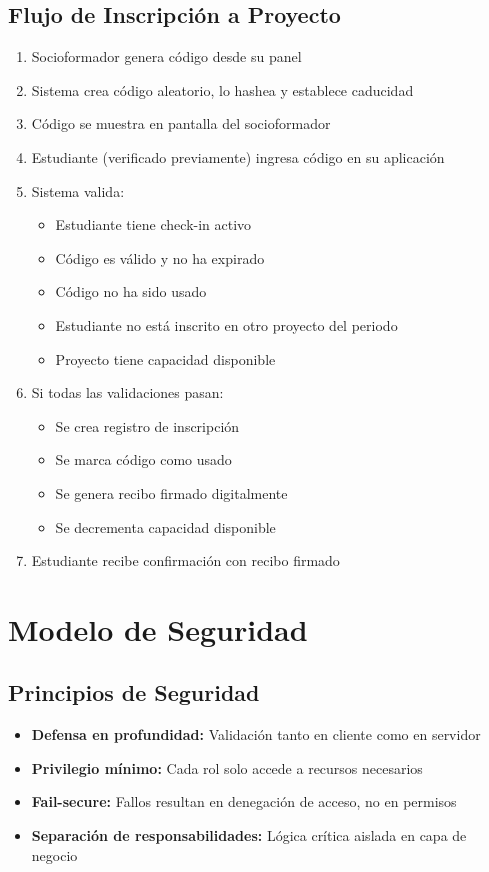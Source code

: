 \documentclass[12pt,a4paper]{article}
\begin{document}
\subsection{Flujo de Inscripción a Proyecto}

\begin{enumerate}
    \item Socioformador genera código desde su panel
    \item Sistema crea código aleatorio, lo hashea y establece caducidad
    \item Código se muestra en pantalla del socioformador
    \item Estudiante (verificado previamente) ingresa código en su aplicación
    \item Sistema valida:
    \begin{itemize}
        \item Estudiante tiene check-in activo
        \item Código es válido y no ha expirado
        \item Código no ha sido usado
        \item Estudiante no está inscrito en otro proyecto del periodo
        \item Proyecto tiene capacidad disponible
    \end{itemize}
    \item Si todas las validaciones pasan:
    \begin{itemize}
        \item Se crea registro de inscripción
        \item Se marca código como usado
        \item Se genera recibo firmado digitalmente
        \item Se decrementa capacidad disponible
    \end{itemize}
    \item Estudiante recibe confirmación con recibo firmado
\end{enumerate}

\section{Modelo de Seguridad}

\subsection{Principios de Seguridad}

\begin{itemize}[leftmargin=*]
    \item \textbf{Defensa en profundidad:} Validación tanto en cliente como en servidor
    \item \textbf{Privilegio mínimo:} Cada rol solo accede a recursos necesarios
    \item \textbf{Fail-secure:} Fallos resultan en denegación de acceso, no en permisos
    \item \textbf{Separación de responsabilidades:} Lógica crítica aislada en capa de negocio
\end{itemize}
\end{document}
